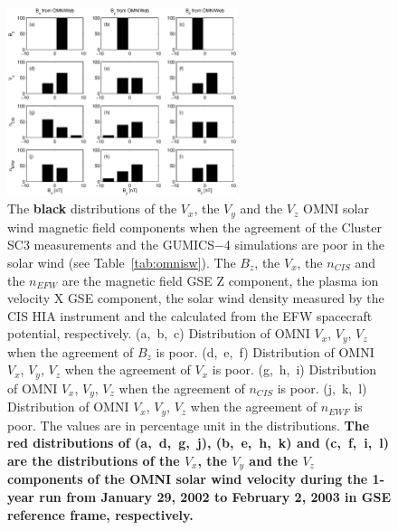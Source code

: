 \documentclass[linenumbers,draft]{agujournal}
\begin{document}
\begin{figure}[h]
\centering
\includegraphics[width=0.6\textwidth,angle=0]{swe-2020-corr-f14}
\caption{The \textbf{black} distributions of the $V_{x}$, the $V_{y}$  and the $V_{z}$ OMNI solar wind magnetic field components when the agreement of the Cluster SC3 measurements and the GUMICS$-$4 simulations are poor in the solar wind (see Table~\ref{tab:omnisw}). The $B_{z}$, the $V_{x}$, the $n_{CIS}$ and the $n_{EFW}$ are the magnetic field GSE Z component, the plasma ion velocity X GSE component, the  solar wind density measured by the CIS HIA instrument and the calculated from the EFW spacecraft potential, respectively. (a,~b,~c) Distribution of OMNI $V_{x}$, $V_{y}$, $V_{z}$ when the agreement of $B_{z}$ is poor. (d,~e,~f) Distribution of OMNI  $V_{x}$, $V_{y}$, $V_{z}$ when the agreement of $V_{x}$ is poor. (g,~h,~i) Distribution of OMNI $V_{x}$, $V_{y}$, $V_{z}$ when the agreement of $n_{CIS}$ is poor. (j,~k,~l) Distribution of OMNI $V_{x}$, $V_{y}$, $V_{z}$ when the agreement of $n_{EWF}$ is poor. The values are in percentage unit in the distributions. \textbf{The red distributions of (a,~d,~g,~j), (b,~e,~h,~k) and (c,~f,~i,~l) are the distributions of the $V_{x}$, the $V_{y}$ and the $V_{z}$ components of the OMNI solar wind velocity during the 1-year run from January 29, 2002 to February 2, 2003 in GSE reference frame, respectively.}}
\label{fig:swomnivxyz}
\end{figure}

\pagebreak
\end{document}
